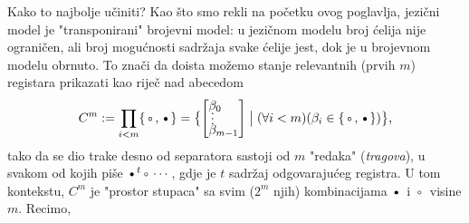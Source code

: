 Kako to najbolje učiniti? Kao što smo rekli na početku ovog poglavlja, jezični model je "transponirani" brojevni model: u jezičnom modelu broj ćelija nije ograničen, ali broj mogućnosti sadržaja svake ćelije jest, dok je u brojevnom modelu obrnuto. To znači da doista možemo stanje relevantnih (prvih $m$) registara prikazati kao riječ nad abecedom
\begin{equation}
\renewcommand{\arraystretch}{0.1}
    C^m:=\prod_{i<m}\{\text\textopenbullet,\text\textbullet\}=\bigl\{\left[\begin{array}{@{}l@{}}\beta_0\\
    \MTFlushSpaceAbove
    \vdotswithin{\beta}\\
    \beta_{m-1}\end{array}\right]\bigm|(\forall i<m)(\beta_i\in\{\text\textopenbullet,\text\textbullet\})\bigr\}\text,
\end{equation}
tako da se dio trake desno od separatora sastoji od $m$ "redaka" (\emph{tragova}), u svakom od kojih piše $\text\textbullet^t\text\textopenbullet\dotsm$, gdje je $t$ sadržaj odgovarajućeg registra. U tom kontekstu, $C^m$ je "prostor stupaca" sa svim ($2^m$ njih) kombinacijama $\text\textbullet$ i $\text\textopenbullet$ visine $m$. Recimo,
